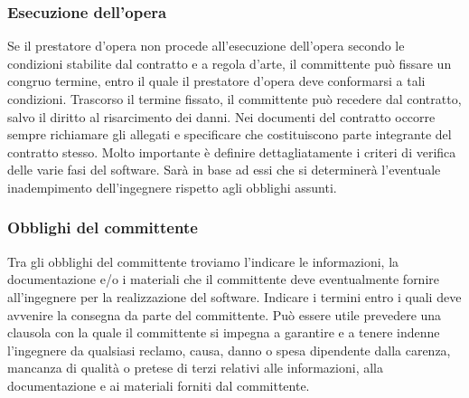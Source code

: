 \subsubsection{Esecuzione dell'opera}
Se il prestatore d'opera non procede all'esecuzione dell'opera secondo le condizioni stabilite dal contratto e a regola d'arte,
il committente può fissare un congruo termine, entro il quale il prestatore d'opera deve conformarsi a tali condizioni. Trascorso il termine fissato, il
committente può recedere dal contratto, salvo il diritto al risarcimento dei danni.\newline
Nei documenti del contratto occorre sempre richiamare gli allegati e specificare che costituiscono parte integrante del contratto
stesso.\newline
Molto importante è definire dettagliatamente i criteri di verifica delle varie fasi del software. Sarà in base ad essi
che si determinerà l'eventuale inadempimento dell'ingegnere rispetto agli obblighi assunti.

\subsubsection{Obblighi del committente}
Tra gli obblighi del committente troviamo l'indicare le informazioni, la documentazione e/o i materiali che il committente deve
eventualmente fornire all'ingegnere per la realizzazione del software.\newline
Indicare i termini entro i quali deve avvenire la consegna da parte del committente.\newline
Può essere utile prevedere una clausola con la quale il committente si impegna a garantire e a tenere indenne l'ingegnere da qualsiasi reclamo,
causa, danno o spesa dipendente dalla carenza, mancanza di qualità o pretese di terzi relativi alle informazioni,
alla documentazione e ai materiali forniti dal committente.

